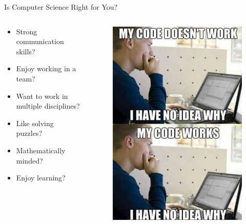 \documentclass{beamer}
\begin{document}
\begin{frame}{Is Computer Science Right for You?}
\begin{columns}
	\begin{column}{.50\textwidth}
	\begin{itemize}
		\item Strong communication skills?
		\item Enjoy working in a team?
		\item Want to work in multiple disciplines?
		\item Like solving puzzles?
		\item Mathematically minded?
		\item Enjoy learning?
	\end{itemize}
	\end{column}
\begin{column}{.50\textwidth}
	\begin{figure}
		\includegraphics[width=\linewidth]{img/noidea.jpg}
	\end{figure}
\end{column}
\end{columns}
\end{frame}
\end{document}
